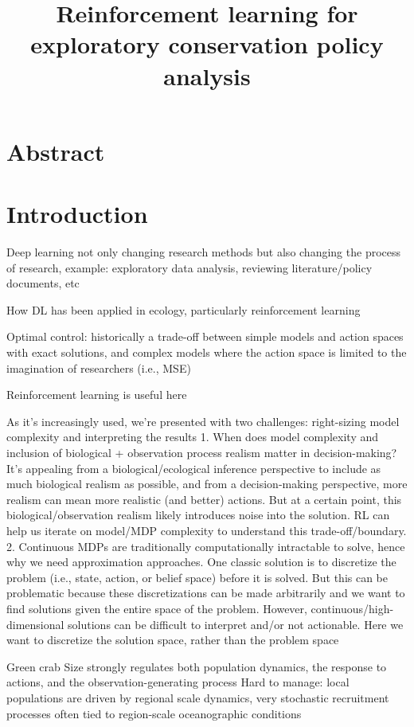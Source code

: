 \documentclass{article}
\title{Reinforcement learning for exploratory conservation policy analysis}
\begin{document}
\date{}

\maketitle

\section{Abstract}

\section{Introduction}

Deep learning not only changing research methods but also changing the process of research, example: exploratory data analysis, reviewing literature/policy documents, etc

How DL has been applied in ecology, particularly reinforcement learning

Optimal control: historically a trade-off between simple models and action spaces with exact solutions, and complex models where the action space is limited to the imagination of researchers (i.e., MSE)

Reinforcement learning is useful here

As it’s increasingly used, we’re presented with two challenges: right-sizing model complexity and interpreting the results
1. When does model complexity and inclusion of biological + observation process realism matter in decision-making? It's appealing from a biological/ecological inference perspective to include as much biological realism as possible, and from a decision-making perspective, more realism can mean more realistic (and better) actions. But at a certain point, this biological/observation realism likely introduces noise into the solution. RL can help us iterate on model/MDP complexity to understand this trade-off/boundary.
2. Continuous MDPs are traditionally computationally intractable to solve, hence why we need approximation approaches. One classic solution is to discretize the problem (i.e., state, action, or belief space) before it is solved. But this can be problematic because these discretizations can be made arbitrarily and we want to find solutions given the entire space of the problem. However, continuous/high-dimensional solutions can be difficult to interpret and/or not actionable. Here we want to discretize the solution space, rather than the problem space

Green crab
Size strongly regulates both population dynamics, the response to actions, and the observation-generating process
Hard to manage: local populations are driven by regional scale dynamics, very stochastic recruitment processes often tied to region-scale oceanographic conditions
\end{document}

